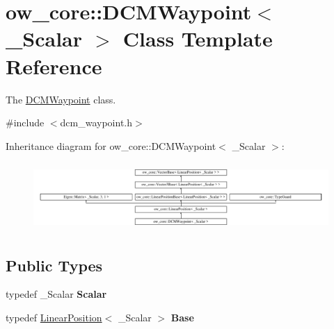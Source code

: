 \hypertarget{classow__core_1_1DCMWaypoint}{}\section{ow\+\_\+core\+:\+:D\+C\+M\+Waypoint$<$ \+\_\+\+Scalar $>$ Class Template Reference}
\label{classow__core_1_1DCMWaypoint}


The \hyperlink{classow__core_1_1DCMWaypoint}{D\+C\+M\+Waypoint} class.  




{\ttfamily \#include $<$dcm\+\_\+waypoint.\+h$>$}

Inheritance diagram for ow\+\_\+core\+:\+:D\+C\+M\+Waypoint$<$ \+\_\+\+Scalar $>$\+:\begin{figure}[H]
\begin{center}
\leavevmode
\includegraphics[height=2.629108cm]{dc/d20/classow__core_1_1DCMWaypoint}
\end{center}
\end{figure}
\subsection*{Public Types}
\begin{DoxyCompactItemize}
\item 
typedef \+\_\+\+Scalar {\bfseries Scalar}\hypertarget{classow__core_1_1DCMWaypoint_ad0f1d3f53c204b945393a8106fbaed43}{}\label{classow__core_1_1DCMWaypoint_ad0f1d3f53c204b945393a8106fbaed43}

\item 
typedef \hyperlink{classow__core_1_1LinearPosition}{Linear\+Position}$<$ \+\_\+\+Scalar $>$ {\bfseries Base}\hypertarget{classow__core_1_1DCMWaypoint_a920c09949206e45364ed455a6d8f72b1}{}\label{classow__core_1_1DCMWaypoint_a920c09949206e45364ed455a6d8f72b1}

\end{DoxyCompactItemize}
